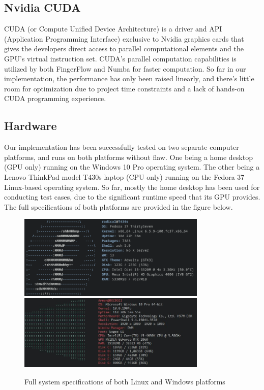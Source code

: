 \documentclass[fyp]{socreport}
\begin{document}
\subsection{Nvidia CUDA}
CUDA (or Compute Unified Device Architecture) is a driver and API (Application Programming Interface) exclusive to Nvidia graphics cards that gives the developers direct access to parallel computational elements and the GPU's virtual instruction set. CUDA's parallel computation capabilities is utilized by both FingerFlow and Numba for faster computation. So far in our implementation, the performance has only been raised linearly, and there's little room for optimization due to project time constraints and a lack of hands-on CUDA programming experience.

\subsection{Hardware}
Our implementation has been successfully tested on two separate computer platforms, and runs on both platforms without flaw. One being a home desktop (GPU only) running on the Windows 10 Pro operating system. The other being a Lenovo ThinkPad model T430s laptop (CPU only) running on the Fedora 37 Linux-based operating system. So far, mostly the home desktop has been used for conducting test cases, due to the significant runtime speed that its GPU provides. The full specifications of both platforms are provided in the figure below.

\begin{figure}[H]
	\centering
	\includegraphics[width=0.8\textwidth]
	{linux_specs}
	\includegraphics[width=0.8\textwidth]
	{windows_specs}
	\caption{Full system specifications of both Linux and Windows platforms}
\end{figure}
\end{document}

